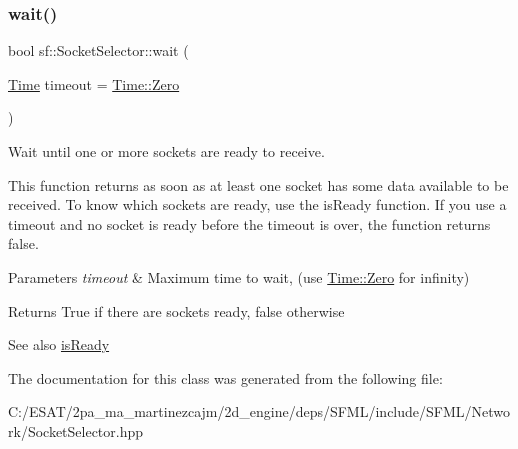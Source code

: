 \subsubsection{\texorpdfstring{wait()}{wait()}}
{\footnotesize\ttfamily bool sf\+::\+Socket\+Selector\+::wait (\begin{DoxyParamCaption}\item[{\hyperlink{classsf_1_1_time}{Time}}]{timeout = {\ttfamily \hyperlink{classsf_1_1_time_a8db127b632fa8da21550e7282af11fa0}{Time\+::\+Zero}} }\end{DoxyParamCaption})}



Wait until one or more sockets are ready to receive. 

This function returns as soon as at least one socket has some data available to be received. To know which sockets are ready, use the is\+Ready function. If you use a timeout and no socket is ready before the timeout is over, the function returns false.


\begin{DoxyParams}{Parameters}
{\em timeout} & Maximum time to wait, (use \hyperlink{classsf_1_1_time_a8db127b632fa8da21550e7282af11fa0}{Time\+::\+Zero} for infinity)\\
\hline
\end{DoxyParams}
\begin{DoxyReturn}{Returns}
True if there are sockets ready, false otherwise
\end{DoxyReturn}
\begin{DoxySeeAlso}{See also}
\hyperlink{classsf_1_1_socket_selector_a917a4bac708290a6782e6686fd3bf889}{is\+Ready} 
\end{DoxySeeAlso}


The documentation for this class was generated from the following file\+:\begin{DoxyCompactItemize}
\item 
C\+:/\+E\+S\+A\+T/2pa\+\_\+ma\+\_\+martinezcajm/2d\+\_\+engine/deps/\+S\+F\+M\+L/include/\+S\+F\+M\+L/\+Network/Socket\+Selector.\+hpp\end{DoxyCompactItemize}
